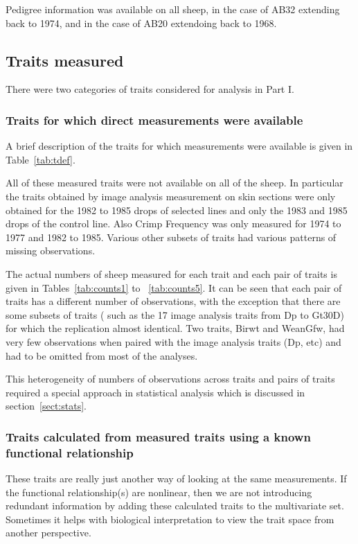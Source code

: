 \documentclass[titlepage]{article}  %
\begin{document}
Pedigree information was available on all sheep, in the case of AB32 extending back to 1974, and in the case of AB20 extendoing back to 1968.

\subsection{Traits measured}
There were two categories of traits considered for analysis in Part I. 

\subsubsection{Traits for which direct measurements were available}
A brief description of the traits for which measurements were available is given in Table~\ref{tab:tdef}.



All of these measured traits were not available on all of the sheep. In particular the traits obtained by image analysis measurement on skin sections were only obtained for the 1982 to 1985 drops of selected lines and only the 1983 and 1985 drops of the control line. Also Crimp Frequency was only measured for 1974 to 1977 and 1982 to 1985. Various other subsets of traits had various patterns of missing observations. 

The actual numbers of sheep measured for each trait and each pair of traits is given in Tables~\ref{tab:counts1} to ~\ref{tab:counts5}. It can be seen that each pair of traits has a different number of observations, with the exception that there are some subsets of traits ( such as the 17 image analysis traits from Dp to Gt30D) for which the replication almost identical. Two traits, Birwt and WeanGfw, had very few observations when paired with the image analysis traits (Dp, etc) and had to be omitted from most of the analyses.







This heterogeneity of numbers of observations across traits and pairs of traits required a special approach in statistical analysis which is discussed in section~\ref{sect:stats}.

\subsubsection{Traits calculated from measured traits using a known functional relationship}
These traits are really just another way of looking at the same measurements. If the functional relationship(s) are nonlinear, then we are not introducing redundant information by adding these calculated traits to the multivariate set. Sometimes it helps with biological interpretation to view the trait space from another perspective.
\end{document}
